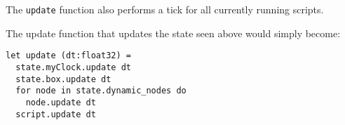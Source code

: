 The \texttt{update} function also performs a tick for all currently running scripts.

The update function that updates the state seen above would simply become:

\begin{lstlisting}
let update (dt:float32) =
  state.myClock.update dt
  state.box.update dt
  for node in state.dynamic_nodes do
    node.update dt
  script.update dt
\end{lstlisting}
